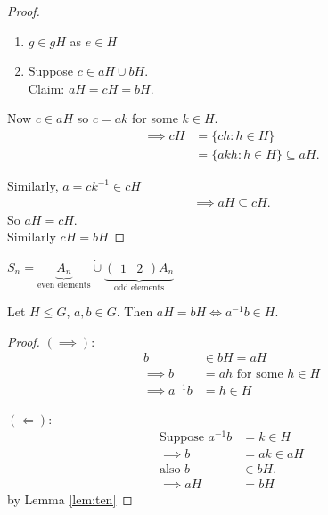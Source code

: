 \begin{proof}
~

\begin{enumerate}
\def\labelenumi{\roman{enumi}.}
\item
  \(g \in gH\) as \(e \in H\)
\item
  Suppose \(c \in aH \cup bH\).\\
  Claim: \(aH = cH = bH\).
\end{enumerate}

Now \(c \in aH\) so \(c = ak\) for some \(k \in H\).
\begin{align*}
    \implies cH &= \{ c h : h \in H \} \\
    &= \{ a k h : h \in H \} \subseteq aH.
\end{align*}

Similarly, \(a = c k^{-1} \in cH\)
\begin{align*}
    \implies aH \subseteq cH.
\end{align*}
So \(aH = cH\).\\
Similarly \(cH = bH\)
\end{proof}

\begin{example}
\(S_n = \underbrace{A_n}_\text{even elements} \dot{\cup} \underbrace{\begin{pmatrix}1 & 2\end{pmatrix} A_n}_\text{odd elements}\)
\end{example}

\begin{lemma}
\protect\hypertarget{lem:eleven}{}\label{lem:eleven}Let \(H \leq G\), \(a, b \in G\).
Then \(aH = bH \iff a^{-1} b \in H\).
\end{lemma}

\begin{proof}
\((\implies)\):
\begin{align*}
    b &\in bH = aH \\
    \implies b &= ah \text{ for some } h \in H \\
    \implies a^{-1} b &= h \in H
\end{align*}

\((\Longleftarrow)\):
\begin{align*}
    \text{Suppose } a^{-1}b &= k \in H \\
    \implies b &= ak \in aH \\
    \text{also } b &\in bH. \\
    \implies aH &= bH
\end{align*} by Lemma \ref{lem:ten}
\end{proof}

